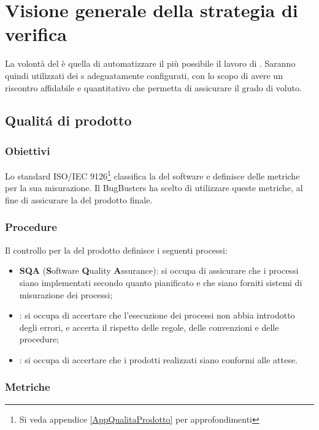 \section{Visione generale della strategia di verifica}
La volontà del  è quella di automatizzare il più possibile il lavoro di . Saranno quindi utilizzati dei s adeguatamente configurati, con lo scopo di avere un riscontro affidabile e quantitativo che permetta di assicurare il grado di  voluto. 

\subsection{Qualit\'a di prodotto}
\subsubsection{Obiettivi}
Lo standard ISO/IEC 9126\footnote{Si veda appendice \ref{AppQualitaProdotto} per approfondimenti} classifica la  del software e definisce delle metriche per la sua misurazione. Il  BugBusters ha scelto di utilizzare queste metriche, al fine di assicurare la  del prodotto finale.

\subsubsection{Procedure}
Il controllo per la  del prodotto definisce i seguenti processi:
\begin{itemize}
	\item \textbf{SQA} (\textbf{S}oftware \textbf{Q}uality \textbf{A}ssurance): si occupa di assicurare che i processi siano implementati secondo quanto pianificato e che siano forniti sistemi di misurazione dei processi;
	\item \textbf{}: si occupa di accertare che l'esecuzione dei processi non abbia introdotto degli errori, e accerta il rispetto delle regole, delle convenzioni e delle procedure;
	\item \textbf{}: si occupa di accertare che i prodotti realizzati siano conformi alle attese.
\end{itemize}

\subsubsection{Metriche}\label{MetricheSoftware}

